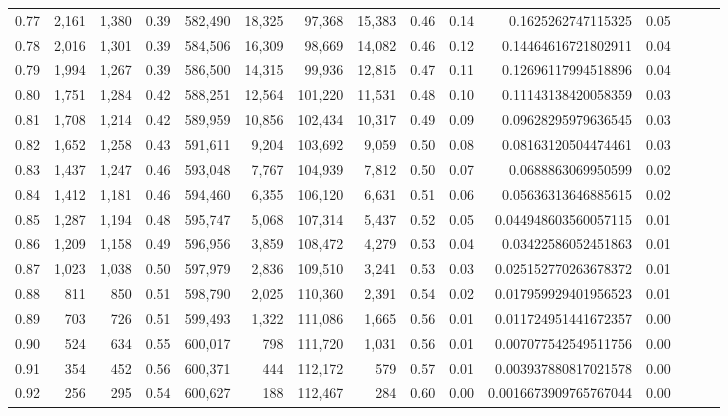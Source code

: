 \begin{tabular}{rrrrrrrrrrrrrrr}
0.77 &   2,161 &  1,380 &  0.39 &  582,490 &   18,325 &   97,368 &   15,383 &  0.46 &  0.14 &      0.1625262747115325 &      0.05 \\
0.78 &   2,016 &  1,301 &  0.39 &  584,506 &   16,309 &   98,669 &   14,082 &  0.46 &  0.12 &     0.14464616721802911 &      0.04 \\
0.79 &   1,994 &  1,267 &  0.39 &  586,500 &   14,315 &   99,936 &   12,815 &  0.47 &  0.11 &     0.12696117994518896 &      0.04 \\
0.80 &   1,751 &  1,284 &  0.42 &  588,251 &   12,564 &  101,220 &   11,531 &  0.48 &  0.10 &     0.11143138420058359 &      0.03 \\
0.81 &   1,708 &  1,214 &  0.42 &  589,959 &   10,856 &  102,434 &   10,317 &  0.49 &  0.09 &     0.09628295979636545 &      0.03 \\
0.82 &   1,652 &  1,258 &  0.43 &  591,611 &    9,204 &  103,692 &    9,059 &  0.50 &  0.08 &     0.08163120504474461 &      0.03 \\
0.83 &   1,437 &  1,247 &  0.46 &  593,048 &    7,767 &  104,939 &    7,812 &  0.50 &  0.07 &      0.0688863069950599 &      0.02 \\
0.84 &   1,412 &  1,181 &  0.46 &  594,460 &    6,355 &  106,120 &    6,631 &  0.51 &  0.06 &     0.05636313646885615 &      0.02 \\
0.85 &   1,287 &  1,194 &  0.48 &  595,747 &    5,068 &  107,314 &    5,437 &  0.52 &  0.05 &    0.044948603560057115 &      0.01 \\
0.86 &   1,209 &  1,158 &  0.49 &  596,956 &    3,859 &  108,472 &    4,279 &  0.53 &  0.04 &     0.03422586052451863 &      0.01 \\
0.87 &   1,023 &  1,038 &  0.50 &  597,979 &    2,836 &  109,510 &    3,241 &  0.53 &  0.03 &    0.025152770263678372 &      0.01 \\
0.88 &     811 &    850 &  0.51 &  598,790 &    2,025 &  110,360 &    2,391 &  0.54 &  0.02 &    0.017959929401956523 &      0.01 \\
0.89 &     703 &    726 &  0.51 &  599,493 &    1,322 &  111,086 &    1,665 &  0.56 &  0.01 &    0.011724951441672357 &      0.00 \\
0.90 &     524 &    634 &  0.55 &  600,017 &      798 &  111,720 &    1,031 &  0.56 &  0.01 &    0.007077542549511756 &      0.00 \\
0.91 &     354 &    452 &  0.56 &  600,371 &      444 &  112,172 &      579 &  0.57 &  0.01 &    0.003937880817021578 &      0.00 \\
0.92 &     256 &    295 &  0.54 &  600,627 &      188 &  112,467 &      284 &  0.60 &  0.00 &   0.0016673909765767044 &      0.00 \\

\end{tabular}
